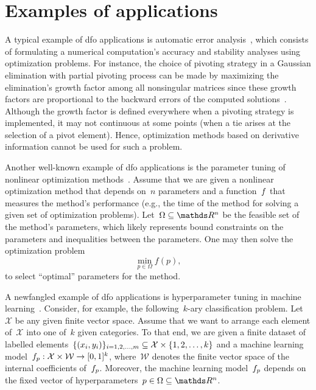 \section{Examples of  applications}

A typical example of \gls{dfo} applications is automatic error analysis~\cite{Higham_1993,Higham_2002}, which consists of formulating a numerical computation's accuracy and stability analyses using optimization problems.
For instance, the choice of pivoting strategy in a Gaussian elimination with partial pivoting process can be made by maximizing the elimination's growth factor among all nonsingular matrices since these growth factors are proportional to the backward errors of the computed solutions~\cite{Wilkinson_1961}.
Although the growth factor is defined everywhere when a pivoting strategy is implemented, it may not continuous at some points (when a tie arises at the selection of a pivot element).
Hence, optimization methods based on derivative information cannot be used for such a problem.

Another well-known example of \gls{dfo} applications is the parameter tuning of nonlinear optimization methods~\cite{Audet_Orban_2006}.
Assume that we are given a nonlinear optimization method that depends on~$n$ parameters and a function~$f$ that measures the method's performance (e.g., the  time of the method for solving a given set of optimization problems).
Let~$\Omega \subseteq \R^n$ be the feasible set of the method's parameters, which likely represents bound constraints on the parameters and inequalities between the parameters.
One may then solve the optimization problem
\begin{equation*}
    \min_{p \in \Omega} f(p),
\end{equation*}
to select \enquote{optimal} parameters for the method.

A newfangled example of \gls{dfo} applications is hyperparameter tuning in machine learning~\cite{Ghanbari_Scheinberg_2017}.
Consider, for example, the following~$k$-ary classification problem.
Let~$\mathcal{X}$ be any given finite vector space.
Assume that we want to arrange each element of~$\mathcal{X}$ into one of~$k$ given categories.
To that end, we are given a finite dataset of labelled elements~$\{(x_i, y_i)\}_{i = 1, 2, \dots, m} \subseteq \mathcal{X} \times \{1, 2, \dots, k\}$ and a machine learning model~$f_p : \mathcal{X} \times \mathcal{W} \to [0, 1]^k$, where~$\mathcal{W}$ denotes the finite vector space of the internal coefficients of~$f_p$.
Moreover, the machine learning model~$f_p$ depends on the fixed vector of hyperparameters~$p \in \Omega \subseteq \R^n$.

